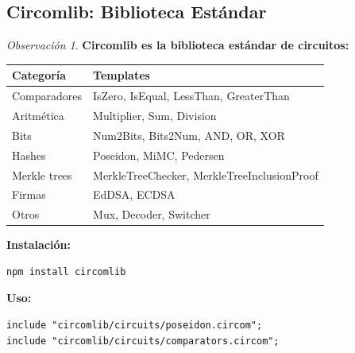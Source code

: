 \documentclass[11pt,a4paper,twoside,openright]{book}
\theoremstyle{definition}
\theoremstyle{plain}
\theoremstyle{remark}
\newtheorem{remark}{Observación}[chapter]
\begin{document}
\subsection{Circomlib: Biblioteca Estándar}

\begin{remark}
\textbf{Circomlib es la biblioteca estándar de circuitos:}

\begin{center}
\begin{tabular}{ll}
\toprule
\textbf{Categoría} & \textbf{Templates} \\
\midrule
Comparadores & IsZero, IsEqual, LessThan, GreaterThan \\
Aritmética & Multiplier, Sum, Division \\
Bits & Num2Bits, Bits2Num, AND, OR, XOR \\
Hashes & Poseidon, MiMC, Pedersen \\
Merkle trees & MerkleTreeChecker, MerkleTreeInclusionProof \\
Firmas & EdDSA, ECDSA \\
Otros & Mux, Decoder, Switcher \\
\bottomrule
\end{tabular}
\end{center}

\textbf{Instalación:}
\begin{verbatim}
npm install circomlib
\end{verbatim}

\textbf{Uso:}
\begin{verbatim}
include "circomlib/circuits/poseidon.circom";
include "circomlib/circuits/comparators.circom";
\end{verbatim}
\end{remark}
\end{document}
